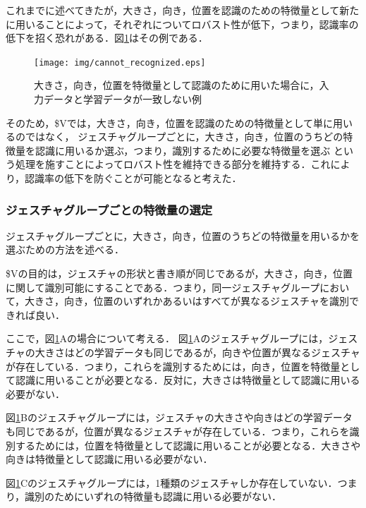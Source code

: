 これまでに述べてきたが，大きさ，向き，位置を認識のための特徴量として新たに用いることによって，それぞれについてロバスト性が低下，つまり，認識率の低下を招く恐れがある．図\ref{fig:cannot_recognized}はその例である．

\begin{figure} [h!]
	\begin{center}
		\texttt{[image: img/cannot\_recognized.eps]}
	\end{center}
	\caption{大きさ，向き，位置を特徴量として認識のために用いた場合に，入力データと学習データが一致しない例}
	\label{fig:cannot_recognized}
\end{figure}

そのため，\$Vでは，大きさ，向き，位置を認識のための特徴量として単に用いるのではなく，
ジェスチャグループごとに，大きさ，向き，位置のうちどの特徴量を認識に用いるか選ぶ，つまり，識別するために必要な特徴量を選ぶ
という処理を施すことによってロバスト性を維持できる部分を維持する．これにより，認識率の低下を防ぐことが可能となると考えた．

\subsubsection{ジェスチャグループごとの特徴量の選定}
ジェスチャグループごとに，大きさ，向き，位置のうちどの特徴量を用いるかを選ぶための方法を述べる．

\$Vの目的は，ジェスチャの形状と書き順が同じであるが，大きさ，向き，位置に関して識別可能にすることである．つまり，同一ジェスチャグループにおいて，大きさ，向き，位置のいずれかあるいはすべてが異なるジェスチャを識別できれば良い．

ここで，図\ref{fig:cannot_recognized}Aの場合について考える．
図\ref{fig:cannot_recognized}Aのジェスチャグループには，ジェスチャの大きさはどの学習データも同じであるが，向きや位置が異なるジェスチャが存在している．つまり，これらを識別するためには，向き，位置を特徴量として認識に用いることが必要となる．反対に，大きさは特徴量として認識に用いる必要がない．

図\ref{fig:cannot_recognized}Bのジェスチャグループには，ジェスチャの大きさや向きはどの学習データも同じであるが，位置が異なるジェスチャが存在している．つまり，これらを識別するためには，位置を特徴量として認識に用いることが必要となる．大きさや向きは特徴量として認識に用いる必要がない．

図\ref{fig:cannot_recognized}Cのジェスチャグループには，1種類のジェスチャしか存在していない．つまり，識別のためにいずれの特徴量も認識に用いる必要がない．

